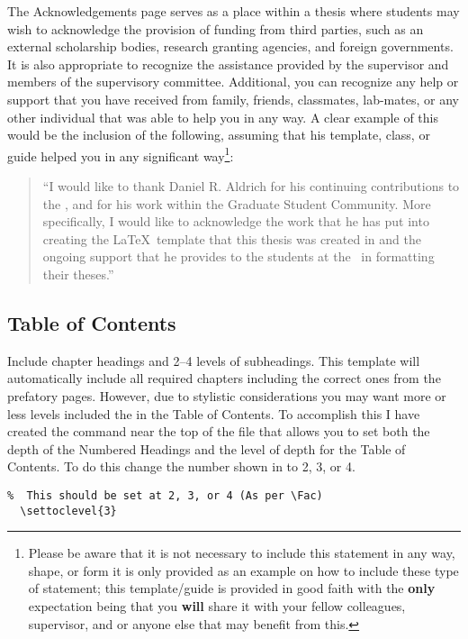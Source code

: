 			The Acknowledgements page serves as a place within a thesis where students may wish to acknowledge the provision of funding from third parties, such as an external scholarship bodies, research granting agencies, and foreign governments. 
			It is also appropriate to recognize the assistance provided by the supervisor and members of the supervisory committee.
			Additional, you can recognize any help or support that you have received from family, friends, classmates, lab-mates, or any other individual that was able to help you in any way.
			A clear example of this would be the inclusion of the following, assuming that his template, class, or guide helped you in any significant way\footnote{Please be aware that it is not necessary to include this statement in any way, shape, or form it is only provided as an example on how to include these type of statement; this template/guide is provided in good faith with the \textbf{only} expectation being that you \textbf{will} share it with your fellow colleagues, supervisor, and or anyone else that may benefit from this.}:
			
			\begin{quote}
				\enquote{I would like to thank Daniel R. Aldrich for his continuing contributions to the \University, and for his work within the Graduate Student Community. More specifically, I would like to acknowledge the work that he has put into creating the \LaTeX\ template that this thesis was created in and the ongoing support that he provides to the students at the \University\ in formatting their theses.}
			\end{quote}

		\subsection{Table of Contents}\label{toc}
			Include chapter headings and 2--4 levels of subheadings. 
			This template will automatically include all required chapters including the correct ones from the prefatory pages.
			However, due to stylistic considerations you may want more or less levels included the in the Table of Contents.
			To accomplish this I have created the command near the top of the  file that allows you to set both the depth of the Numbered Headings and the level of depth for the Table of Contents.
			To do this change the number shown in  to 2, 3, or 4.
			\begin{lstlisting}[float=ht,caption=Set Numbered Heading and ToC Level,label=lst:tocLevels,style=LaTeXStyle,basicstyle=\scriptsize\ttfamily,]
% Option to change the Level of subheading included in the Table of Contents
%  This should be set at 2, 3, or 4 (As per \Fac)
  \settoclevel{3}
			\end{lstlisting}

